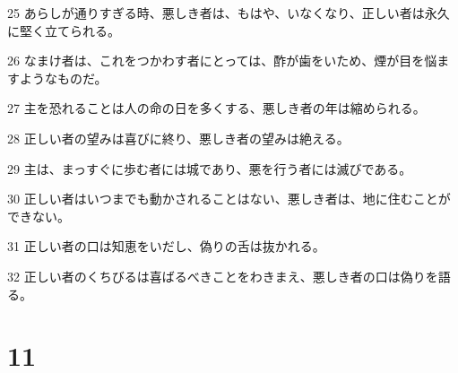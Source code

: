 \par 25 あらしが通りすぎる時、悪しき者は、もはや、いなくなり、正しい者は永久に堅く立てられる。
\par 26 なまけ者は、これをつかわす者にとっては、酢が歯をいため、煙が目を悩ますようなものだ。
\par 27 主を恐れることは人の命の日を多くする、悪しき者の年は縮められる。
\par 28 正しい者の望みは喜びに終り、悪しき者の望みは絶える。
\par 29 主は、まっすぐに歩む者には城であり、悪を行う者には滅びである。
\par 30 正しい者はいつまでも動かされることはない、悪しき者は、地に住むことができない。
\par 31 正しい者の口は知恵をいだし、偽りの舌は抜かれる。
\par 32 正しい者のくちびるは喜ばるべきことをわきまえ、悪しき者の口は偽りを語る。

\chapter{11}


